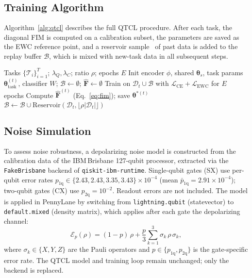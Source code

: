\documentclass{llncs}
\begin{document}
\subsection{Training Algorithm}
\label{subsec:alg}

Algorithm~\ref{alg:qtcl} describes the full QTCL procedure.
After each task, the diagonal FIM is computed on a calibration subset,
the parameters are saved as the EWC reference point, and a reservoir
sample~\cite{vitter1985random} of past data is added to the replay buffer
$\mathcal{B}$, which is mixed with new-task data in all subsequent steps.

\begin{algorithm}[t]
\caption{QTCL: Fisher EWC + Experience Replay}
\label{alg:qtcl}
\small
\begin{algorithmic}[1]
\Require Tasks $\{\mathcal{T}_i\}_{i=1}^T$; $\lambda_Q,\lambda_C$; ratio $\rho$; epochs $E$
\State Init encoder $\phi$, shared $\boldsymbol\theta_s$,
       task params $\boldsymbol\theta_\mathrm{task}^{(t)}$, classifier $W$;
       $\mathcal{B}\!\leftarrow\!\emptyset$; $\hat{\mathbf{F}}\!\leftarrow\!\emptyset$
  \State Train on $\mathcal{D}_t\cup\mathcal{B}$ with $\mathcal{L}_\mathrm{CE}+\mathcal{L}_\mathrm{EWC}$ for $E$ epochs
  \State Compute $\hat{\mathbf{F}}^{(t)}$ (Eq.~\ref{eq:fim}); save $\boldsymbol\theta^{*(t)}$
  \State $\mathcal{B}\leftarrow\mathcal{B}\cup\mathrm{Reservoir}(\mathcal{D}_t,\lfloor\rho|\mathcal{D}_t|\rfloor)$
\EndFor
\end{algorithmic}
\end{algorithm}

\subsection{Noise Simulation}
\label{subsec:noise_method}

To assess noise robustness, a depolarizing noise model is constructed from the
calibration data of the IBM\,Brisbane 127-qubit processor, extracted via the
\texttt{FakeBrisbane} backend of \texttt{qiskit-ibm-runtime}.
Single-qubit gates (SX) use per-qubit error rates
$p_\mathrm{1q} \in \{2.43, 2.43, 3.35, 3.43\}\times10^{-4}$
(mean $\bar{p}_\mathrm{1q}=2.91\times10^{-4}$); two-qubit gates (CX) use
$p_\mathrm{2q}=10^{-2}$.
Readout errors are not included.
The model is applied in PennyLane by switching from \texttt{lightning.qubit}
(statevector) to \texttt{default.mixed} (density matrix), which applies after
each gate the depolarizing channel:
\begin{equation}
  \mathcal{E}_p(\rho) =
  (1-p)\,\rho + \frac{p}{3}\!\sum_{k=1}^{3} \sigma_k\,\rho\,\sigma_k,
  \label{eq:depol}
\end{equation}
where $\sigma_k\in\{X,Y,Z\}$ are the Pauli operators and $p\in\{p_\mathrm{1q},
p_\mathrm{2q}\}$ is the gate-specific error rate.
The QTCL model and training loop remain unchanged; only the backend is replaced.
\end{document}

